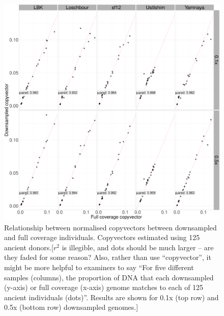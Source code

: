 \begin{figure}[htp]
    \centering
    \includegraphics[width=1.0\textwidth]{../images/chapter1/CP_correlation_allSamples_0.1x_0.5x_30x.pdf}
    \caption{Relationship between normalised copyvectors between downsampled and full coverage individuals. Copyvectors estimated using 125 ancient donors.{\color{red}[$r^2$ is illegible, and dots should be much larger -- are they faded for some reason? Also, rather than use ``copyvector'', it might be more helpful to examiners to say ``For five different samples (columns), the proportion of DNA that each downsampled (y-axis) or full coverage (x-axis) genome matches to each of 125 ancient individuals (dots)''. Results are shown for 0.1x (top row) and 0.5x (bottom row) downsampled genomes.]}}
    \label{fig:CP_correlation_allSamples_0.1x_0.5x_30x}
\end{figure}

